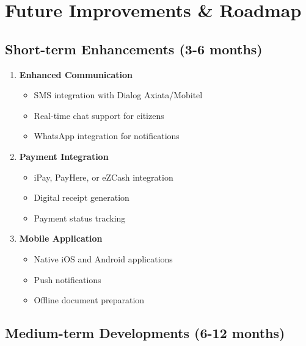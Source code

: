 \documentclass[11pt,a4paper]{article}
\begin{document}
\section{Future Improvements \& Roadmap}

\subsection{Short-term Enhancements (3-6 months)}

\begin{enumerate}[leftmargin=*]
    \item \textbf{Enhanced Communication}
    \begin{itemize}
        \item SMS integration with Dialog Axiata/Mobitel
        \item Real-time chat support for citizens
        \item WhatsApp integration for notifications
    \end{itemize}
    
    \item \textbf{Payment Integration}
    \begin{itemize}
        \item iPay, PayHere, or eZCash integration
        \item Digital receipt generation
        \item Payment status tracking
    \end{itemize}
    
    \item \textbf{Mobile Application}
    \begin{itemize}
        \item Native iOS and Android applications
        \item Push notifications
        \item Offline document preparation
    \end{itemize}
\end{enumerate}

\subsection{Medium-term Developments (6-12 months)}
\end{document}
